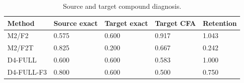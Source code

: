 \begin{table}[t]
\centering
\small
\caption{Source and target compound diagnosis.}
\begin{tabular}{lllll}
\hline
Method & Source exact & Target exact & Target CFA & Retention \\
\hline
M2/F2 & 0.575 & 0.600 & 0.917 & 1.043 \\
M2/F2T & 0.825 & 0.200 & 0.667 & 0.242 \\
D4-FULL & 0.600 & 0.600 & 0.583 & 1.000 \\
D4-FULL-F3 & 0.800 & 0.600 & 0.500 & 0.750 \\
\hline
\end{tabular}
\end{table}
